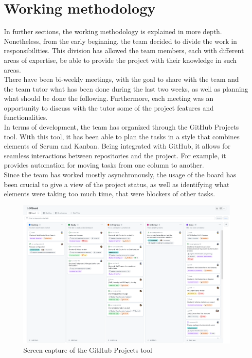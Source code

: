 \documentclass[../memory.tex]{subfiles}
\begin{document}
\section{Working methodology}
In further sections, the working methodology is explained in more depth.
Nonetheless, from the early beginning, the team decided to divide the work in
responsibilities. This division has allowed the team members, each with
different areas of expertise, be able to provide the project with their
knowledge in such areas.
\\
There have been bi-weekly meetings, with the goal to share with the team and the
team tutor what has been done during the last two weeks, as well as planning
what should be done the following. Furthermore, each meeting was an opportunity
to discuss with the tutor some of the project features and functionalities.
\\[8pt]
In terms of development, the team has organized through the GitHub Projects tool.
With this tool, it has been able to plan the tasks in a style that combines
elements of Scrum and Kanban. Being integrated with GitHub, it allows for
seamless interactions between repositories and the project. For example, it
provides automation for moving tasks from one column to another.
\\
Since the team has worked mostly asynchronously, the usage of the board has been
crucial to give a view of the project status, as well as identifying what
elements were taking too much time, that were blockers of other tasks.
\begin{figure}[H]
	\centering
	\includegraphics[width=\textwidth]{./assets/github-projects.png}
	\caption{Screen capture of the GitHub Projects tool}
\end{figure}
\end{document}
